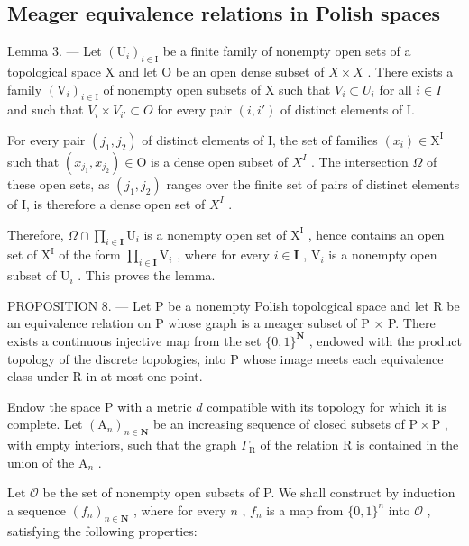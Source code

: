 \subsection{Meager equivalence relations in Polish spaces}

Lemma 3. --- Let \((\mathrm{U}_{i})_{i\in\mathrm{I}}\) be a finite family of nonempty open sets of a topological space X and let O be an open dense subset of \(X\times X\) . There exists a family \((\mathrm{V}_{i})_{i\in\mathrm{I}}\) of nonempty open subsets of X such that \(V_{i}\subset U_{i}\) for all \(i\in I\) and such that \(V_{i}\times V_{i'}\subset O\) for every pair \((i,i')\) of distinct elements of I.

For every pair \((j_{1}, j_{2})\) of distinct elements of I, the set of families \((x_{i}) \in \mathrm{X}^{\mathrm{I}}\) such that \((x_{j_{1}}, x_{j_{2}}) \in \mathrm{O}\) is a dense open subset of \(X^{I}\) . The intersection \(\Omega\) of these open sets, as \((j_{1}, j_{2})\) ranges over the finite set of pairs of distinct elements of I, is therefore a dense open set of \(X^{I}\) .

Therefore, \(\Omega \cap \prod_{i\in \mathbf{I}}\mathrm{U}_i\) is a nonempty open set of \(\mathrm{X}^{\mathrm{I}}\) , hence contains an open set of \(\mathrm{X}^{\mathrm{I}}\) of the form \(\prod_{i\in \mathbf{I}}\mathrm{V}_i\) , where for every \(i\in \mathbf{I}\) , \(\mathrm{V}_i\) is a nonempty open subset of \(\mathrm{U}_i\) . This proves the lemma.

PROPOSITION 8. --- Let P be a nonempty Polish topological space and let R be an equivalence relation on P whose graph is a meager subset of P × P. There exists a continuous injective map from the set \(\{0,1\}^{\mathbf{N}}\) , endowed with the product topology of the discrete topologies, into P whose image meets each equivalence class under R in at most one point.

Endow the space P with a metric \(d\) compatible with its topology for which it is complete. Let \((\mathrm{A}_n)_{n\in \mathbf{N}}\) be an increasing sequence of closed subsets of \(\mathrm{P}\times \mathrm{P}\) , with empty interiors, such that the graph \(\Gamma_{\mathrm{R}}\) of the relation R is contained in the union of the \(\mathrm{A}_n\) .

Let \(\mathcal{O}\) be the set of nonempty open subsets of P. We shall construct by induction a sequence \((f_n)_{n \in \mathbf{N}}\) , where for every \(n\) , \(f_n\) is a map from \(\{0,1\}^n\) into \(\mathcal{O}\) , satisfying the following properties:

